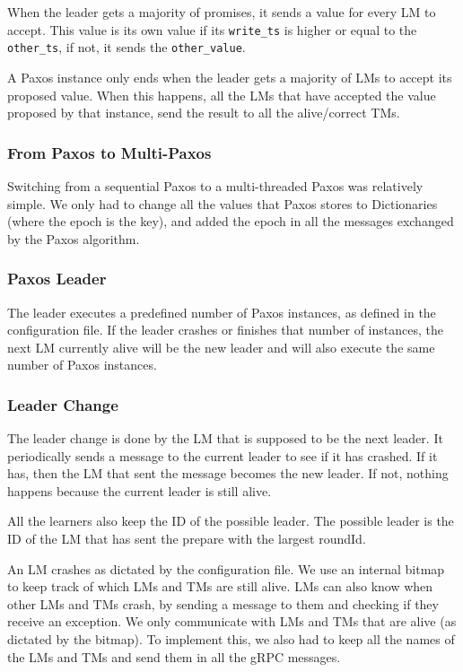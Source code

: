 \documentclass[times, 10pt,twocolumn]{article}
\begin{document}
When the leader gets a majority of promises, it sends a value for every LM to accept.
This value is its own value if its \texttt{write\_ts} is higher or equal to the \texttt{other\_ts}, if not, it sends the \texttt{other\_value}.

A Paxos instance only ends when the leader gets a majority of LMs to accept its proposed value.
When this happens, all the LMs that have accepted the value proposed by that instance, send the result to all the alive/correct TMs.

\subsubsection{From Paxos to Multi-Paxos}

Switching from a sequential Paxos to a multi-threaded Paxos was relatively simple.
We only had to change all the values that Paxos stores to Dictionaries (where the epoch is the key), and added the epoch in all the messages exchanged by the Paxos algorithm.

\subsubsection{Paxos Leader}

The leader executes a predefined number of Paxos instances, as defined in the configuration file.
If the leader crashes or finishes that number of instances, the next LM currently alive will be the new leader and will also execute the same number of Paxos instances.

\subsubsection{Leader Change}

The leader change is done by the LM that is supposed to be the next leader.
It periodically sends a message to the current leader to see if it has crashed.
If it has, then the LM that sent the message becomes the new leader.
If not, nothing happens because the current leader is still alive.

All the learners also keep the ID of the possible leader.
The possible leader is the ID of the LM that has sent the prepare with the largest roundId.


An LM crashes as dictated by the configuration file.
We use an internal bitmap to keep track of which LMs and TMs are still alive.
LMs can also know when other LMs and TMs crash, by sending a message to them and checking if they receive an exception.
We only communicate with LMs and TMs that are alive (as dictated by the bitmap).
To implement this, we also had to keep all the names of the LMs and TMs and send them in all the gRPC messages.
\end{document}
